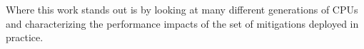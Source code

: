 Where this work stands out is by looking at many different generations of CPUs and characterizing the performance impacts of the set of mitigations deployed in practice.



%




